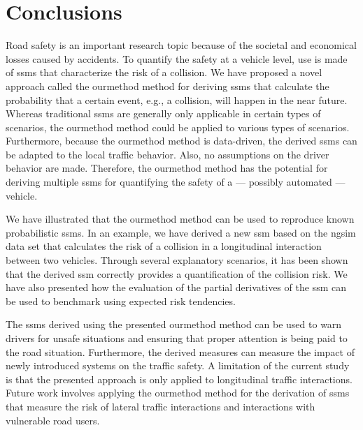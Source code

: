 \section{Conclusions}
\label{sec:conclusions}

Road safety is an important research topic because of the societal and economical losses caused by accidents.
To quantify the safety at a vehicle level, use is made of \acp{ssm} that characterize the risk of a collision. 
\cstarta We have proposed a novel approach called the \ac{ourmethod} method for deriving \acp{ssm} that calculate the probability that a certain event, e.g., a collision, will happen in the near future. 
Whereas traditional \acp{ssm} are generally only applicable in certain types of scenarios, the \ac{ourmethod} method could be applied to various types of scenarios.
Furthermore, because the \ac{ourmethod} method is data-driven, the derived \acp{ssm} can be adapted to the local traffic behavior. 
Also, no assumptions on the driver behavior are made.
Therefore, the \ac{ourmethod} method has the potential for deriving multiple \acp{ssm} for quantifying the safety of a --- possibly automated --- vehicle.

We have illustrated that the \ac{ourmethod} method can be used to reproduce known probabilistic \acp{ssm}.
In an example, we have derived a new \ac{ssm} based on the \ac{ngsim} data set that calculates the risk of a collision in a longitudinal interaction between two vehicles.
Through several explanatory scenarios, it has been shown that the derived \ac{ssm} correctly provides a quantification of the collision risk.
We have also presented how the evaluation of the partial derivatives of the \ac{ssm} can be used to benchmark  using expected risk tendencies. \cenda

The \acp{ssm} derived using the presented \ac{ourmethod} method can be used to warn drivers for unsafe situations and ensuring that proper attention is being paid to the road situation.
Furthermore, the derived measures can measure the impact of newly introduced systems on the traffic safety. 
A limitation of the current study is that the presented approach is only applied to longitudinal traffic interactions. 
\cstarta Future work involves applying the \ac{ourmethod} method for the derivation of \acp{ssm} that measure the risk of lateral traffic interactions and interactions with vulnerable road users. \cenda
